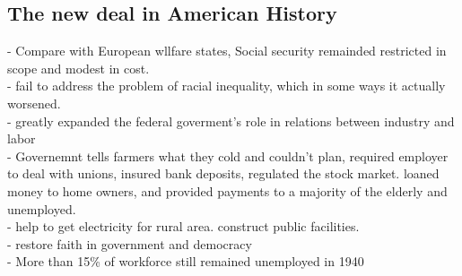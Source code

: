 \documentclass{article}
\begin{document}
\subsection{ The new deal in American History}
- Compare with European wllfare states, Social security remainded restricted in scope and modest in cost.\\
- fail to address the problem of racial inequality, which in some ways it actually worsened.\\
- greatly expanded the federal goverment's role in relations between industry and labor\\
- Governemnt tells farmers what they cold and couldn't plan, required employer to deal with unions, insured bank deposits, regulated the stock market. loaned money to home owners, and provided payments to a majority of the elderly and unemployed. \\
- help to get electricity for rural area. construct public facilities.\\
- restore faith in government and democracy\\
- More than 15\% of workforce still remained unemployed in 1940\\
\end{document}

